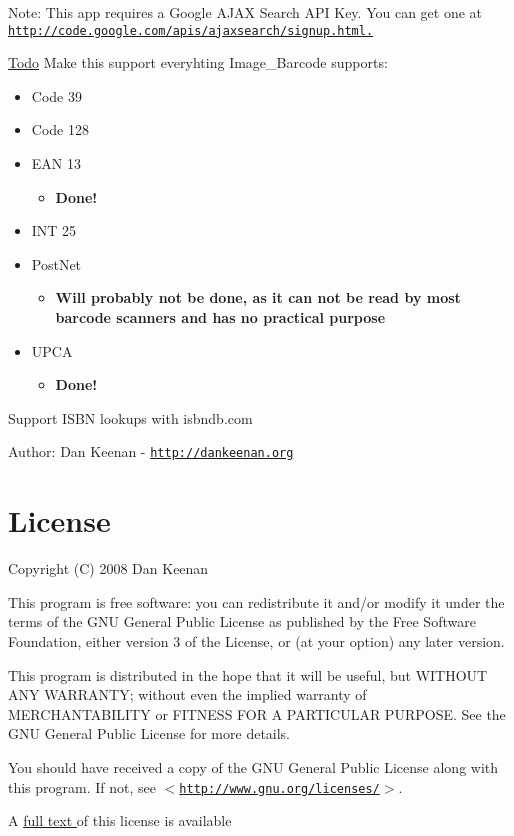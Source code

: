 \begin{Desc}
\item[Note:]This app requires a Google AJAX Search API Key. You can get one at \href{http://code.google.com/apis/ajaxsearch/signup.html.}{\tt http://code.google.com/apis/ajaxsearch/signup.html.} \end{Desc}
\begin{Desc}
\item[\hyperlink{todo__todo000001}{Todo}]Make this support everyhting Image\_\-Barcode supports:\begin{itemize}
\item Code 39\item Code 128\item EAN 13\begin{itemize}
\item {\bf Done!} \end{itemize}
\item INT 25\item PostNet\begin{itemize}
\item {\bf Will probably not be done, as it can not be read by most barcode scanners and has no practical purpose}\end{itemize}
\item UPCA\begin{itemize}
\item {\bf Done!} \end{itemize}
\end{itemize}


Support ISBN lookups with isbndb.com\end{Desc}
\begin{Desc}
\item[Author:]Dan Keenan - \href{http://dankeenan.org}{\tt http://dankeenan.org} \end{Desc}
\hypertarget{index_license}{}\section{License}\label{index_license}
Copyright (C) 2008 Dan Keenan

This program is free software: you can redistribute it and/or modify it under the terms of the GNU General Public License as published by the Free Software Foundation, either version 3 of the License, or (at your option) any later version.

This program is distributed in the hope that it will be useful, but WITHOUT ANY WARRANTY; without even the implied warranty of MERCHANTABILITY or FITNESS FOR A PARTICULAR PURPOSE. See the GNU General Public License for more details.

You should have received a copy of the GNU General Public License along with this program. If not, see $<$\href{http://www.gnu.org/licenses/}{\tt http://www.gnu.org/licenses/}$>$.



A \hyperlink{license}{full text } of this license is available 